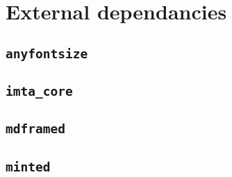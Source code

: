 \documentclass{report}
\begin{document}
\section{External dependancies}
\subsection{\texttt{anyfontsize}}
\subsection{\texttt{imta\_core}}
\subsection{\texttt{mdframed}}
\subsection{\texttt{minted}}


\imtaMakeCover
\end{document}
